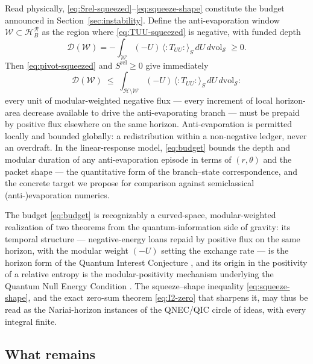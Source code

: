 \documentclass[11pt]{article}
\newcommand{\Srel}{S^{\mathrm{rel}}}
\newcommand{\Nariai}{Nariai}
\begin{document}
Read physically, \eqref{eq:Srel-squeezed}--\eqref{eq:squeeze-shape} constitute the budget announced in Section~\ref{sec:instability}. Define the anti-evaporation window $\mathcal{W} \subset \mathcal{H}_B^{\mathcal{R}}$ as the region where \eqref{eq:TUU-squeezed} is negative, with funded depth
\begin{equation}
\mathcal{D}(\mathcal{W})
= -\int_{\mathcal{W}} (-U)\, \big\langle{:}T_{UU}{:}\big\rangle_S \, dU\, d\mathrm{vol}_{\mathcal{S}} \;\ge 0 .
\end{equation}
Then \eqref{eq:pivot-squeezed} and $\Srel \ge 0$ give immediately
\begin{equation}
\mathcal{D}(\mathcal{W})
\;\le\;
\int_{\mathcal{H}\setminus\mathcal{W}} (-U)\,\big\langle{:}T_{UU}{:}\big\rangle_S\, dU\, d\mathrm{vol}_{\mathcal{S}} :
\label{eq:budget}
\end{equation}
every unit of modular-weighted negative flux --- every increment of local horizon-area decrease available to drive the anti-evaporating branch --- must be prepaid by positive flux elsewhere on the same horizon. Anti-evaporation is permitted locally and bounded globally: a redistribution within a non-negative ledger, never an overdraft. In the linear-response model, \eqref{eq:budget} bounds the depth and modular duration of any anti-evaporation episode in terms of $(r, \theta)$ and the packet shape --- the quantitative form of the branch--state correspondence, and the concrete target we propose for comparison against semiclassical (anti-)evaporation numerics.

The budget \eqref{eq:budget} is recognizably a curved-space, modular-weighted realization of two theorems from the quantum-information side of gravity: its temporal structure --- negative-energy loans repaid by positive flux on the same horizon, with the modular weight $(-U)$ setting the exchange rate --- is the horizon form of the Quantum Interest Conjecture \cite{FordRoman}, and its origin in the positivity of a relative entropy is the modular-positivity mechanism underlying the Quantum Null Energy Condition \cite{QNEC,FLPW}. The squeeze--shape inequality \eqref{eq:squeeze-shape}, and the exact zero-sum theorem \eqref{eq:I2-zero} that sharpens it, may thus be read as the \Nariai{}-horizon instances of the QNEC/QIC circle of ideas, with every integral finite.

\subsection{What remains}
\label{app:remains}
\end{document}
